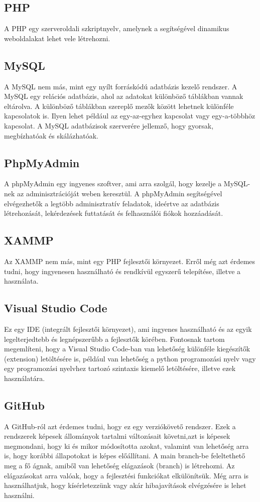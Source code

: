 \documentclass[]{thesis-ekf}
\theoremstyle{definition}
\theoremstyle{remark}
\begin{document}
	\subsection{PHP}
		A PHP egy szerveroldali szkriptnyelv, amelynek a segítségével dinamikus weboldalakat lehet vele létrehozni.
	\subsection{MySQL}
		A MySQL nem más, mint egy nyílt forráskódú adatbázis kezelő rendszer. A MySQL egy relációs adatbázis, ahol az adatokat különböző táblákban vannak eltárolva. A különböző táblákban szereplő mezők között lehetnek különféle kapcsolatok is. Ilyen lehet például az egy-az-egyhez kapcsolat vagy egy-a-többhöz kapcsolat. A MySQL adatbázisok szerverére jellemző, hogy gyorsak, megbízhatóak és skálázhatóak.
		\cite{MySQL}
	\subsection{PhpMyAdmin}
		A phpMyAdmin egy ingyenes szoftver, ami arra szolgál, hogy kezelje a MySQL-nek az adminisztrációját weben keresztül. A phpMyAdmin segítségével elvégezhetők a legtöbb adminisztratív feladatok, ideértve az adatbázis létrehozását, lekérdezések futtatását és felhasználói fiókok hozzáadását.
		\cite{PhpMyAdmin}
	\subsection{XAMMP}
		Az XAMMP nem más, mint egy PHP fejlesztői környezet. Erről még azt érdemes tudni, hogy ingyenesen használható és rendkívül egyszerű telepítése, illetve a használata.
	\subsection{Visual Studio Code}
		Ez egy IDE (integrált fejlesztői környezet), ami ingyenes használható és az egyik legelterjedtebb és legnépszerűbb a fejlesztők körében. Fontosnak tartom megemlíteni, hogy a Visual Studio Code-ban van lehetőség különféle kiegészítők (extension) letöltésére is, például van lehetőség a python programozási nyelv vagy egy programozási nyelvhez tartozó szintaxis kiemelő letöltésére, illetve ezek használatára.
	\subsection{GitHub}
		A GitHub-ról azt érdemes tudni, hogy ez egy verziókövető rendszer. Ezek a rendszerek képesek állományok tartalmi változásait követni,azt is képesek megmondani, hogy ki és mikor módosította azokat, valamint van lehetőség arra is, hogy korábbi állapotokat is képes előállítani. A main branch-be feleltethető meg a fő ágnak, amiből van lehetőség elágazások (branch) is létrehozni. Az elágazásokat arra valóak, hogy a fejlesztési funkciókat elkülönítsük. Még arra is használhatjuk, hogy kísérletezzünk vagy akár hibajavítások elvégzésére is lehet használni.
\end{document}
